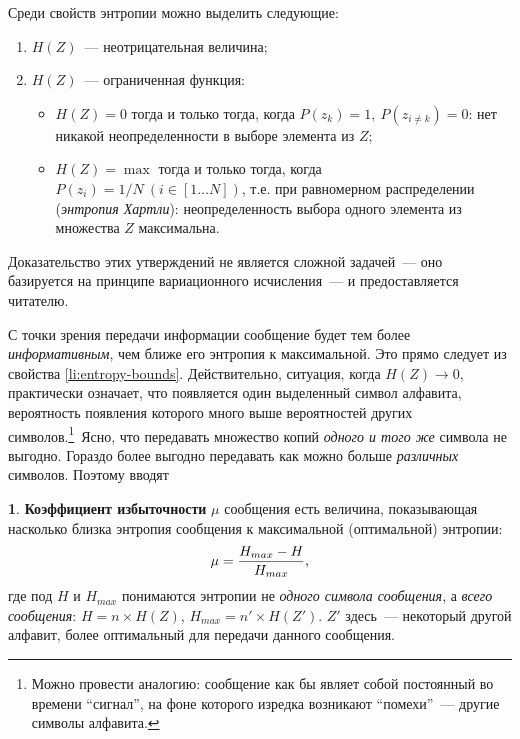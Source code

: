 \documentclass[12pt,a4paper,openright]{book}
\theoremstyle{definition}
\newtheorem{definition}{\textls[150]{Определение}}[chapter]
\numberwithin{equation}{chapter}
\begin{document}
	Среди свойств энтропии можно выделить следующие:
	\begin{enumerate}
		\item $H(Z)$~--- неотрицательная величина;
		\item\label{li:entropy-bounds} $H(Z)$~--- ограниченная функция:
		\begin{itemize}
			\item $H(Z) = 0$ тогда и только тогда, когда $P(z_k) = 1, \ P(z_{i \neq k}) = 0$: нет никакой неопределенности в выборе элемента из $Z$;
			\item $H(Z) = \max$ тогда и только тогда, когда $P(z_i) = {1 / N} \ (i \in [1 \dots N])$, т.е. при равномерном распределении (\textit{энтропия Хартли}): неопределенность выбора одного элемента из множества $Z$ максимальна.
		\end{itemize}
	\end{enumerate}
	Доказательство этих утверждений не является сложной задачей~--- оно базируется на принципе вариационного исчисления~--- и предоставляется читателю.

	С точки зрения передачи информации сообщение будет тем более \textit{информативным}, чем ближе его энтропия к максимальной. Это прямо следует из свойства \ref{li:entropy-bounds}. Действительно, ситуация, когда $H(Z) \rightarrow 0$, практически означает, что появляется один выделенный символ алфавита, вероятность появления которого много выше вероятностей других символов.\footnote{Можно провести аналогию: сообщение как бы являет собой постоянный во времени ``сигнал'', на фоне которого изредка возникают ``помехи''~--- другие символы алфавита.}\ Ясно, что передавать множество копий \textit{одного и того же} символа не выгодно. Гораздо более выгодно передавать как можно больше \textit{различных} символов. Поэтому вводят
	\begin{definition}
		\textbf{Коэффициент избыточности} $\mu$ сообщения есть величина, показывающая насколько близка энтропия сообщения к максимальной (оптимальной) энтропии:
		\begin{equation}
			\mu = {{H_{max} - H} \over H_{max}} \text{,}
		\end{equation}
		где под $H$ и $H_{max}$ понимаются энтропии не \textit{одного символа сообщения}, а \textit{всего сообщения}: $H = n \times H(Z)$, $H_{max} = n' \times H(Z')$. $Z'$ здесь~--- некоторый другой алфавит, более оптимальный для передачи данного сообщения.
	\end{definition}
\end{document}
